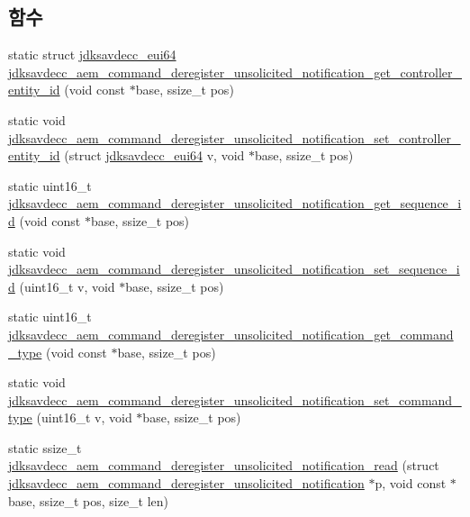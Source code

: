 \subsection*{함수}
\begin{DoxyCompactItemize}
\item 
static struct \hyperlink{structjdksavdecc__eui64}{jdksavdecc\+\_\+eui64} \hyperlink{group__command__deregister__unsolicited__notification_ga02e36d5e00d09169feabfedf5edb7419}{jdksavdecc\+\_\+aem\+\_\+command\+\_\+deregister\+\_\+unsolicited\+\_\+notification\+\_\+get\+\_\+controller\+\_\+entity\+\_\+id} (void const $\ast$base, ssize\+\_\+t pos)
\item 
static void \hyperlink{group__command__deregister__unsolicited__notification_ga72c8a0aa45ff66500ae4ab2945a10100}{jdksavdecc\+\_\+aem\+\_\+command\+\_\+deregister\+\_\+unsolicited\+\_\+notification\+\_\+set\+\_\+controller\+\_\+entity\+\_\+id} (struct \hyperlink{structjdksavdecc__eui64}{jdksavdecc\+\_\+eui64} v, void $\ast$base, ssize\+\_\+t pos)
\item 
static uint16\+\_\+t \hyperlink{group__command__deregister__unsolicited__notification_ga993032a61997715899bdce4dc4b35fe8}{jdksavdecc\+\_\+aem\+\_\+command\+\_\+deregister\+\_\+unsolicited\+\_\+notification\+\_\+get\+\_\+sequence\+\_\+id} (void const $\ast$base, ssize\+\_\+t pos)
\item 
static void \hyperlink{group__command__deregister__unsolicited__notification_gad6c69cbea14fe758cf8a08e36ee67bc6}{jdksavdecc\+\_\+aem\+\_\+command\+\_\+deregister\+\_\+unsolicited\+\_\+notification\+\_\+set\+\_\+sequence\+\_\+id} (uint16\+\_\+t v, void $\ast$base, ssize\+\_\+t pos)
\item 
static uint16\+\_\+t \hyperlink{group__command__deregister__unsolicited__notification_ga462344ebf96106637cf206ba0ba8f050}{jdksavdecc\+\_\+aem\+\_\+command\+\_\+deregister\+\_\+unsolicited\+\_\+notification\+\_\+get\+\_\+command\+\_\+type} (void const $\ast$base, ssize\+\_\+t pos)
\item 
static void \hyperlink{group__command__deregister__unsolicited__notification_gaae56362baeefce25ebfedd06a879979a}{jdksavdecc\+\_\+aem\+\_\+command\+\_\+deregister\+\_\+unsolicited\+\_\+notification\+\_\+set\+\_\+command\+\_\+type} (uint16\+\_\+t v, void $\ast$base, ssize\+\_\+t pos)
\item 
static ssize\+\_\+t \hyperlink{group__command__deregister__unsolicited__notification_ga548427b0abd2f90f32d1042b375f464e}{jdksavdecc\+\_\+aem\+\_\+command\+\_\+deregister\+\_\+unsolicited\+\_\+notification\+\_\+read} (struct \hyperlink{structjdksavdecc__aem__command__deregister__unsolicited__notification}{jdksavdecc\+\_\+aem\+\_\+command\+\_\+deregister\+\_\+unsolicited\+\_\+notification} $\ast$p, void const $\ast$base, ssize\+\_\+t pos, size\+\_\+t len)

\end{DoxyCompactItemize}
